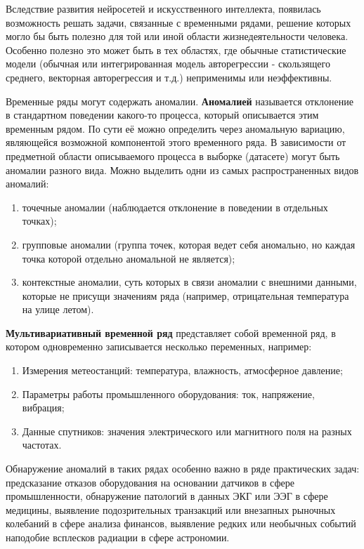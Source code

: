 \documentclass[spec, och, diploma]{SCWorks}
\begin{document}
    Вследствие развития нейросетей и искусственного интеллекта, появилась
    возможность решать задачи, связанные с временными рядами, решение которых
    могло бы быть полезно для той или иной области жизнедеятельности человека.
    Особенно полезно это может быть в тех областях, где обычные статистические
    модели (обычная или интегрированная модель авторегрессии - скользящего
    среднего, векторная авторегрессия и т.д.) неприменимы или неэффективны.

    Временные ряды могут содержать аномалии. \textbf{Аномалией} называется
    отклонение в стандартном поведении какого-то процесса, который описывается
    этим временным рядом. По сути её можно определить через аномальную вариацию,
    являющейся возможной компонентой этого временного ряда. В зависимости от
    предметной области описываемого процесса в выборке (датасете) могут быть
    аномалии разного вида. Можно выделить одни из самых распространенных видов
    аномалий:

    \begin{enumerate}
        \item точечные аномалии (наблюдается отклонение в поведении в отдельных
        точках);
        \item групповые аномалии (группа точек, которая ведет себя аномально, но
        каждая точка которой отдельно аномальной не является);
        \item контекстные аномалии, суть которых в связи аномалии с внешними
        данными, которые не присущи значениям ряда (например, отрицательная
        температура на улице летом).
    \end{enumerate}

    \textbf{Мультивариативный временной ряд} представляет собой временной ряд, в
    котором одновременно записывается несколько переменных, например:

    \begin{enumerate}
        \item Измерения метеостанций: температура, влажность, атмосферное
        давление;
        \item Параметры работы промышленного оборудования: ток, напряжение,
        вибрация;
        \item Данные спутников: значения электрического или магнитного поля на
        разных частотах.
    \end{enumerate}

    Обнаружение аномалий в таких рядах особенно важно в ряде практических задач:
    предсказание отказов оборудования на основании датчиков в сфере
    промышленности, обнаружение патологий в данных ЭКГ или ЭЭГ в сфере медицины,
    выявление подозрительных транзакций или внезапных рыночных колебаний в сфере
    анализа финансов, выявление редких или необычных событий наподобие всплесков
    радиации в сфере астрономии.
\end{document}
